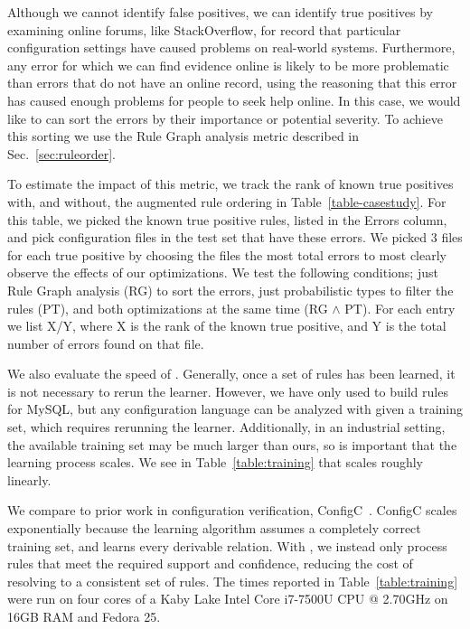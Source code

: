 Although we cannot identify false positives, we can identify true positives by examining online forums, like StackOverflow, for record that
particular configuration settings have caused problems on real-world systems.
Furthermore, any error for which we can find evidence online is likely to be more problematic than errors that do not have an online record, 
  using the reasoning that this error has caused enough problems for people to seek help online.
In this case, we would like \app to can sort the errors by their importance or potential severity.
To achieve this sorting we use the Rule Graph analysis metric described in Sec.~\ref{sec:ruleorder}.

To estimate the impact of this metric, we track the rank of known true positives with, and without, the augmented rule ordering in Table~\ref{table-casestudy}.
For this table, we picked the known true positive rules, listed in the Errors column, and pick configuration files in the test set that have these errors.
We picked 3 files for each true positive by choosing the files the most total errors to most clearly observe the effects of our optimizations.
We test the following conditions; just Rule Graph analysis (RG) to sort the errors, just probabilistic types to filter the rules (PT), and both optimizations at the same time (RG $\land$ PT).
For each entry we list X/Y, where X is the rank of the known true positive, and Y is the total number of errors found on that file.



We also evaluate the speed of \app.
Generally, once a set of rules has been learned, it is not necessary to rerun the learner.
However, we have only used \app to build rules for MySQL, but any configuration language can be analyzed with \app given a training set, which requires rerunning the learner.
Additionally, in an industrial setting, the available training set may be much larger than ours, so is important that the learning process scales.
We see in Table~\ref{table:training} that \app scales roughly linearly.

We compare \app to prior work in configuration verification, ConfigC~\cite{santolucitoCAV}.
ConfigC scales exponentially because the learning algorithm assumes a completely correct training set, and learns every derivable relation.
With \app, we instead only process rules that meet the required support and confidence, reducing the cost of resolving to a consistent set of rules. 
The times reported in Table~\ref{table:training} were run on four cores of a Kaby Lake Intel Core i7-7500U CPU @ 2.70GHz on 16GB RAM and Fedora 25.

